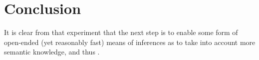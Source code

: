 \documentclass[runningheads]{llncs}
\begin{document}




\section{Conclusion}

It is clear from that experiment that the next step is to enable some
form of open-ended (yet reasonably fast) means of inferences as to
take into account more semantic knowledge, and thus .

%
%


\end{document}
